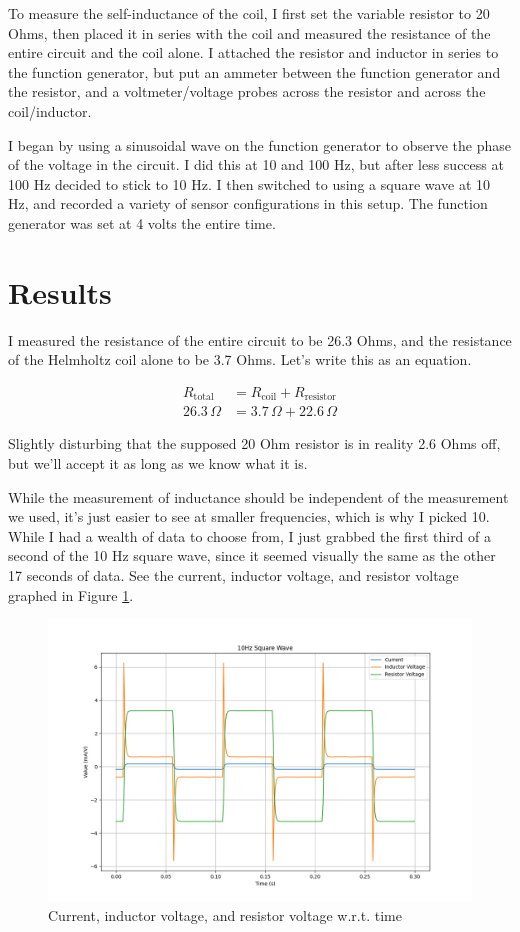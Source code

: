 \documentclass[12pt,letterpaper]{article}
\begin{document}
To measure the self-inductance of the coil, I first set the variable resistor to 20 Ohms, then placed it in series with the coil and measured the resistance of the entire circuit and the coil alone. I attached the resistor and inductor in series to the function generator, but put an ammeter between the function generator and the resistor, and a voltmeter/voltage probes across the resistor and across the coil/inductor.

I began by using a sinusoidal wave on the function generator to observe the phase of the voltage in the circuit. I did this at 10 and 100 Hz, but after less success at 100 Hz decided to stick to 10 Hz. I then switched to using a square wave at 10 Hz, and recorded a variety of sensor configurations in this setup. The function generator was set at 4 volts the entire time.

\section{Results}

I measured the resistance of the entire circuit to be 26.3 Ohms, and the resistance of the Helmholtz coil alone to be 3.7 Ohms. Let's write this as an equation.

\begin{align*}
    R_{\text{total}}&=R_{\text{coil}}+R_{\text{resistor}} \\
    26.3 \, \Omega &= 3.7 \, \Omega + 22.6 \, \Omega
\end{align*}

Slightly disturbing that the supposed 20 Ohm resistor is in reality 2.6 Ohms off, but we'll accept it as long as we know what it is.

While the measurement of inductance should be independent of the measurement we used, it's just easier to see at smaller frequencies, which is why I picked 10. While I had a wealth of data to choose from, I just grabbed the first third of a second of the 10 Hz square wave, since it seemed visually the same as the other 17 seconds of data. See the current, inductor voltage, and resistor voltage graphed in Figure \ref{fig:square}.

\begin{figure}[ht]
    \centering
    \includegraphics[width=5in]{images/all-square.png}
    \caption{Current, inductor voltage, and resistor voltage w.r.t. time}
    \label{fig:square}
\end{figure}
\end{document}

